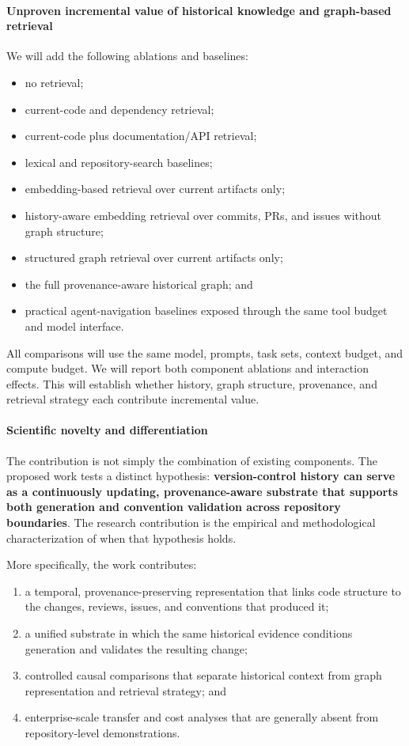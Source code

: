 \documentclass[11pt]{article}
\begin{document}
\paragraph{Unproven incremental value of historical knowledge and graph-based retrieval}

We will add the following ablations and baselines:

\begin{itemize}
  \item no retrieval;
  \item current-code and dependency retrieval;
  \item current-code plus documentation/API retrieval;
  \item lexical and repository-search baselines;
  \item embedding-based retrieval over current artifacts only;
  \item history-aware embedding retrieval over commits, PRs, and issues without graph structure;
  \item structured graph retrieval over current artifacts only;
  \item the full provenance-aware historical graph; and
  \item practical agent-navigation baselines exposed through the same tool budget and model interface.
\end{itemize}

All comparisons will use the same model, prompts, task sets, context budget, and compute budget. We will report both component ablations and interaction effects. This will establish whether history, graph structure, provenance, and retrieval strategy each contribute incremental value.

\paragraph{Scientific novelty and differentiation}
The contribution is not simply the combination of existing components. The proposed work tests a distinct hypothesis: \textbf{version-control history can serve as a continuously updating, provenance-aware substrate that supports both generation and convention validation across repository boundaries}. The research contribution is the empirical and methodological characterization of when that hypothesis holds.

More specifically, the work contributes:

\begin{enumerate}
  \item a temporal, provenance-preserving representation that links code structure to the changes, reviews, issues, and conventions that produced it;
  \item a unified substrate in which the same historical evidence conditions generation and validates the resulting change;
  \item controlled causal comparisons that separate historical context from graph representation and retrieval strategy; and
  \item enterprise-scale transfer and cost analyses that are generally absent from repository-level demonstrations.
\end{enumerate}
\end{document}
